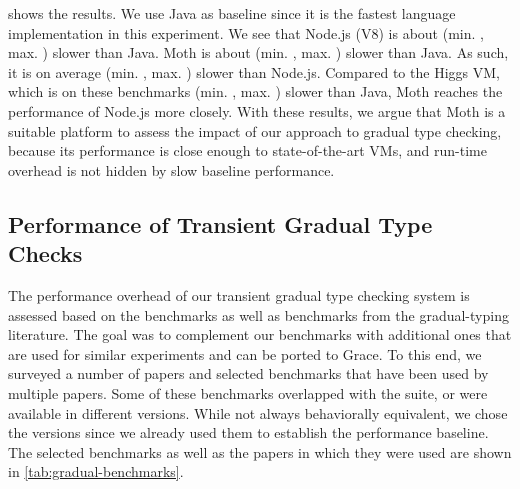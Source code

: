  shows the results.
We use Java as baseline since it is the fastest language implementation
in this experiment.
We see that Node.js (V8) is about
\OverheadNodeGMeanX (min. \OverheadNodeMinX, max. \OverheadNodeMaxX)
slower than Java.
Moth is about \OverheadMothGMeanX (min. \OverheadMothMinX, max. \OverheadMothMaxX) slower than Java.
As such, it is on average \OverheadMothNodeGMeanP (min. \OverheadMothNodeMinP, max. \OverheadMothNodeMaxX) slower than Node.js.
Compared to the Higgs VM, which is on these benchmarks
\OverheadHiggsGMeanX (min. \OverheadHiggsMinX, max. \OverheadHiggsMaxX) slower than Java,
Moth reaches the performance of Node.js more closely.
With these results, we argue that Moth is a suitable platform to
assess the impact of our approach to gradual type checking,
because its performance is close enough to state-of-the-art VMs,
and run-time overhead is not hidden by slow baseline performance.


\subsection{Performance of Transient Gradual Type Checks}


The performance overhead of our transient gradual type checking system
is assessed based on the \AWFY benchmarks
as well as benchmarks from the gradual-typing literature.
The goal was to complement our benchmarks with additional ones that are
used for similar experiments and can be ported to Grace.
To this end, we surveyed a number of papers\citep{Takikawa2016,Vitousek2017,Muehlboeck2017,Bauman2017,Richards2017,Stulova2016,Greenman2018}
and selected benchmarks that have been used by multiple papers.
Some of these benchmarks overlapped with the \AWFY suite,
or were available in different versions.
While not always behaviorally equivalent,
we chose the \AWFY versions since we already used them to
establish the performance baseline.
The selected benchmarks as well as the papers in which they were used are shown in
\cref{tab:gradual-benchmarks}.

